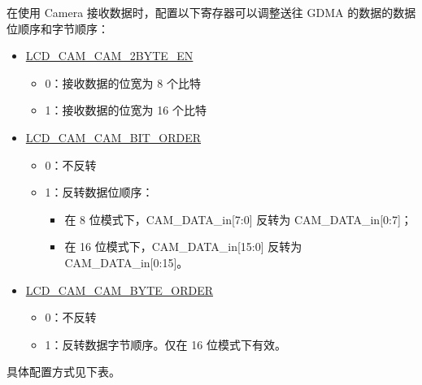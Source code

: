 \documentclass[main\_\_CN.tex]{subfiles}
\begin{document}
在使用 Camera 接收数据时，配置以下寄存器可以调整送往 GDMA 的数据的数据位顺序和字节顺序：

\begin{itemize}
    \item \hyperref[fielddesc:LCDCAMCAM2BYTEEN]{LCD\_CAM\_CAM\_2BYTE\_EN}
    \begin{itemize}
        \item 0：接收数据的位宽为 8 个比特
        \item 1：接收数据的位宽为 16 个比特
    \end{itemize}
    \item \hyperref[fielddesc:LCDCAMCAMBITORDER]{LCD\_CAM\_CAM\_BIT\_ORDER}
    \begin{itemize}
        \item 0：不反转
        \item 1：反转数据位顺序：
        \begin{itemize}
            \item 在 8 位模式下，CAM\_DATA\_in[7:0] 反转为 CAM\_DATA\_in[0:7]；
            \item 在 16 位模式下，CAM\_DATA\_in[15:0] 反转为 CAM\_DATA\_in[0:15]。
        \end{itemize}
    \end{itemize}
    \item \hyperref[fielddesc:LCDCAMCAMBYTEORDER]{LCD\_CAM\_CAM\_BYTE\_ORDER}
    \begin{itemize}
        \item 0：不反转
        \item 1：反转数据字节顺序。仅在 16 位模式下有效。
    \end{itemize}
\end{itemize}

具体配置方式见下表。
\end{document}
